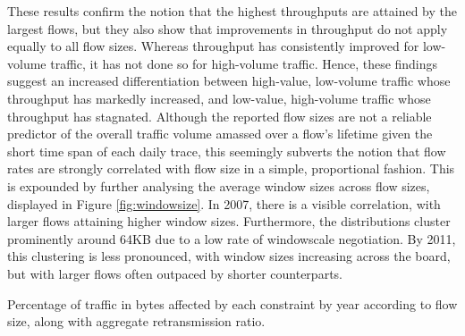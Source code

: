 These results confirm the notion that the highest throughputs are attained by the largest flows, but they also show that improvements in throughput do not apply equally to all flow sizes. 
Whereas throughput has consistently improved for low-volume traffic, it has not done so for high-volume traffic. 
Hence, these findings suggest an increased differentiation between high-value, low-volume traffic whose throughput has markedly increased, and low-value, high-volume traffic whose throughput has stagnated.
Although the reported flow sizes are not a reliable predictor of the overall traffic volume amassed over a flow's lifetime given the short time span of each daily trace, this seemingly subverts the notion that flow rates are strongly correlated with flow size in a simple, proportional fashion.  
This is expounded by further analysing the average window sizes across flow sizes, displayed in Figure \ref{fig:windowsize}.
In 2007, there is a visible correlation, with larger flows attaining higher window sizes.
Furthermore, the distributions cluster prominently around 64KB due to a low rate of windowscale negotiation.
By 2011, this clustering is less pronounced, with window sizes increasing across the board, but with larger flows often outpaced by shorter counterparts.



\begin{table}\footnotesize
\centering
\caption[Percentage of traffic in bytes affected by each constraint by year according to flow size.]{Percentage of traffic in bytes affected by each constraint by year according to flow size, along with aggregate retransmission ratio.}
\label{table:full}
\end{table}

